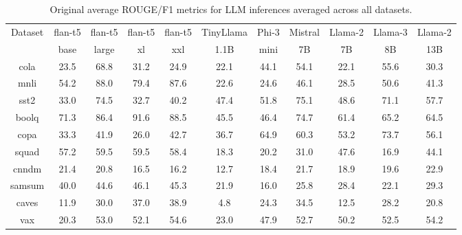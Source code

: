 
\begin{table*}[!ht]
    \begin{center}
    \footnotesize
    
        \begin{tabular}{|c||c|c|c|c||c|c|c|c|c|c|}
        \hline
        Dataset & flan-t5 & flan-t5 & flan-t5 & flan-t5 & TinyLlama & Phi-3 & Mistral & Llama-2 &  Llama-3 & Llama-2 \\
                                & base    & large    & xl      & xxl    & 1.1B      & mini  & 7B      & 7B      & 8B & 13B\\
        \hline \hline
        cola & 23.5 & 68.8 & 31.2 & 24.9 & 22.1 & 44.1 & 54.1 & 22.1 & 55.6 & 30.3\\ 
        mnli & 54.2 & 88.0 & 79.4 & 87.6 & 22.6 & 24.6 & 46.1 & 28.5 & 50.6 & 41.3\\ 
        sst2 & 33.0 & 74.5 & 32.7 & 40.2 & 47.4 & 51.8 & 75.1 & 48.6 & 71.1 & 57.7\\ 

        \hline
        
        boolq & 71.3 & 86.4 & 91.6 & 88.5 & 45.5 & 46.4 & 74.7 & 61.4 & 65.2 & 64.5\\ 
        copa & 33.3 & 41.9 & 26.0 & 42.7 & 36.7 & 64.9 & 60.3 & 53.2 & 73.7 & 56.1\\ 
        squad & 57.2 & 59.5 & 59.5 & 58.4 & 18.3 & 20.2 & 31.0 & 47.6 & 16.9 & 44.1\\ 

        \hline

        cnndm & 21.4 & 20.8 & 16.5 & 16.2 & 12.7 & 18.4 & 21.7 & 18.9 & 19.6 & 22.9\\ 
        samsum & 40.0 & 44.6 & 46.1 & 45.3 & 21.9 & 16.0 & 25.8 & 28.4 & 22.1 & 29.3\\ 

        \hline
        
        caves & 11.9 & 30.0 & 37.0 & 38.9 & 4.8 & 24.3 & 34.5 & 12.5 & 28.2 & 20.8\\ 
        vax & 20.3 & 53.0 & 52.1 & 54.6 & 23.0 & 47.9 & 52.7 & 50.2 & 52.5 & 54.2\\ 
        \hline
        \end{tabular}
        \caption{Original average ROUGE/F1 metrics for LLM inferences averaged across all datasets. 
        }%
        \label{tab:metrics-app}
    \end{center}
\end{table*}

